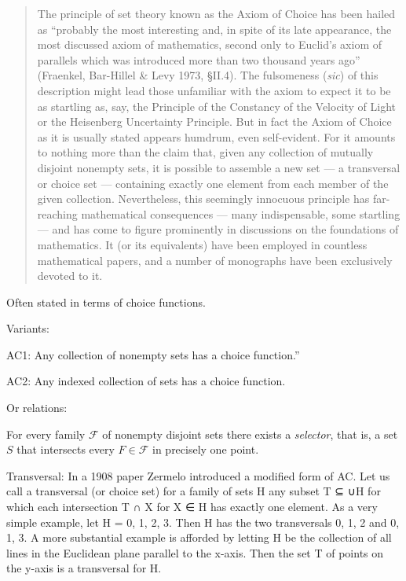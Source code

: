 \blockquote{The principle of set theory known as the Axiom of Choice has been hailed as “probably the most interesting and, in spite of its late appearance, the most discussed axiom of mathematics, second only to Euclid's axiom of parallels which was introduced more than two thousand years ago” (Fraenkel, Bar-Hillel \& Levy 1973, §II.4).  The fulsomeness (\textit{sic}) of this description might lead those unfamiliar with the axiom to expect it to be as startling as, say, the Principle of the Constancy of the Velocity of Light or the Heisenberg Uncertainty Principle. But in fact the Axiom of Choice as it is usually stated appears humdrum, even self-evident. For it amounts to nothing more than the claim that, given any collection of mutually disjoint nonempty sets, it is possible to assemble a new set — a transversal or choice set — containing exactly one element from each member of the given collection. Nevertheless, this seemingly innocuous principle has far-reaching mathematical consequences — many indispensable, some startling — and has come to figure prominently in discussions on the foundations of mathematics. It (or its equivalents) have been employed in countless mathematical papers, and a number of monographs have been exclusively devoted to it.\cite{bell_axiom_2013}}

Often stated in terms of choice functions.

Variants:

AC1: 
Any collection of nonempty sets has a choice function.''

AC2: 
Any indexed collection of sets has a choice function.

Or relations:

\begin{axiom}
\label{ax:choice}
For every family $\mathcal{F}$ of nonempty disjoint sets there exists
a \textit{selector}, that is, a set $S$ that intersects every $F\in
\mathcal{F}$ in precisely one point.\cite{ciesielski_set_1997}
\end{axiom}

Transversal:  In a 1908 paper Zermelo introduced a modified form of AC. Let us call a transversal (or choice set) for a family of sets H any subset T ⊆ ∪H for which each intersection T ∩ X for X ∈ H has exactly one element.  As a very simple example, let H = {{0}, {1}, {2, 3}}. Then H has the two transversals {0, 1, 2} and {0, 1, 3}. A more substantial example is afforded by letting H be the collection of all lines in the Euclidean plane parallel to the x-axis. Then the set T of points on the y-axis is a transversal for H.

